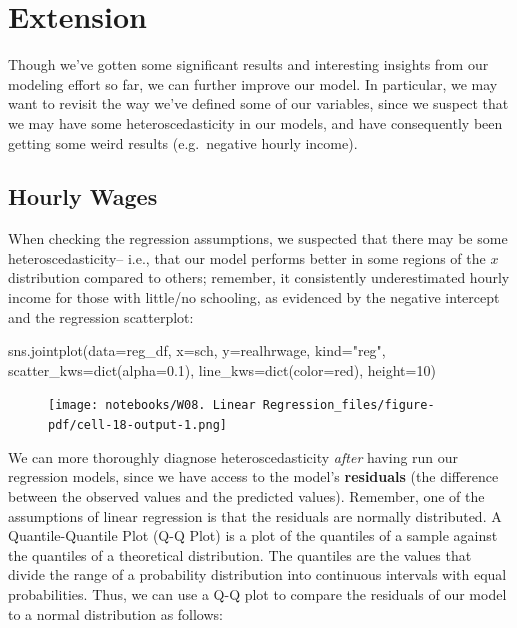 \documentclass[
  letterpaper,
  DIV=11,
  numbers=noendperiod]{scrreprt}
\newenvironment{Shaded}{\begin{snugshade}}{\end{snugshade}}
\newcommand{\BuiltInTok}[1]{\textcolor[rgb]{0.00,0.23,0.31}{#1}}
\newcommand{\DecValTok}[1]{\textcolor[rgb]{0.68,0.00,0.00}{#1}}
\newcommand{\FloatTok}[1]{\textcolor[rgb]{0.68,0.00,0.00}{#1}}
\newcommand{\NormalTok}[1]{\textcolor[rgb]{0.00,0.23,0.31}{#1}}
\newcommand{\OperatorTok}[1]{\textcolor[rgb]{0.37,0.37,0.37}{#1}}
\newcommand{\StringTok}[1]{\textcolor[rgb]{0.13,0.47,0.30}{#1}}
\begin{document}
\hypertarget{extension-2}{%
\section{Extension}\label{extension-2}}

Though we've gotten some significant results and interesting insights
from our modeling effort so far, we can further improve our model. In
particular, we may want to revisit the way we've defined some of our
variables, since we suspect that we may have some heteroscedasticity in
our models, and have consequently been getting some weird results
(e.g.~negative hourly income).

\hypertarget{hourly-wages}{%
\subsection{Hourly Wages}\label{hourly-wages}}

When checking the regression assumptions, we suspected that there may be
some heteroscedasticity-- i.e., that our model performs better in some
regions of the \(x\) distribution compared to others; remember, it
consistently underestimated hourly income for those with little/no
schooling, as evidenced by the negative intercept and the regression
scatterplot:

\begin{Shaded}
\begin{Highlighting}[]
\NormalTok{sns.jointplot(data}\OperatorTok{=}\NormalTok{reg\_df, x}\OperatorTok{=}\StringTok{\textquotesingle{}sch\textquotesingle{}}\NormalTok{, y}\OperatorTok{=}\StringTok{\textquotesingle{}realhrwage\textquotesingle{}}\NormalTok{, kind}\OperatorTok{=}\StringTok{"reg"}\NormalTok{,  scatter\_kws}\OperatorTok{=}\BuiltInTok{dict}\NormalTok{(alpha}\OperatorTok{=}\FloatTok{0.1}\NormalTok{), line\_kws}\OperatorTok{=}\BuiltInTok{dict}\NormalTok{(color}\OperatorTok{=}\StringTok{\textquotesingle{}red\textquotesingle{}}\NormalTok{), height}\OperatorTok{=}\DecValTok{10}\NormalTok{)}
\end{Highlighting}
\end{Shaded}

\begin{figure}[H]

{\centering \texttt{[image: notebooks/W08. Linear Regression\_files/figure-pdf/cell-18-output-1.png]}

}

\end{figure}

We can more thoroughly diagnose heteroscedasticity \emph{after} having
run our regression models, since we have access to the model's
\textbf{residuals} (the difference between the observed values and the
predicted values). Remember, one of the assumptions of linear regression
is that the residuals are normally distributed. A Quantile-Quantile Plot
(Q-Q Plot) is a plot of the quantiles of a sample against the quantiles
of a theoretical distribution. The quantiles are the values that divide
the range of a probability distribution into continuous intervals with
equal probabilities. Thus, we can use a Q-Q plot to compare the
residuals of our model to a normal distribution as follows:
\end{document}
